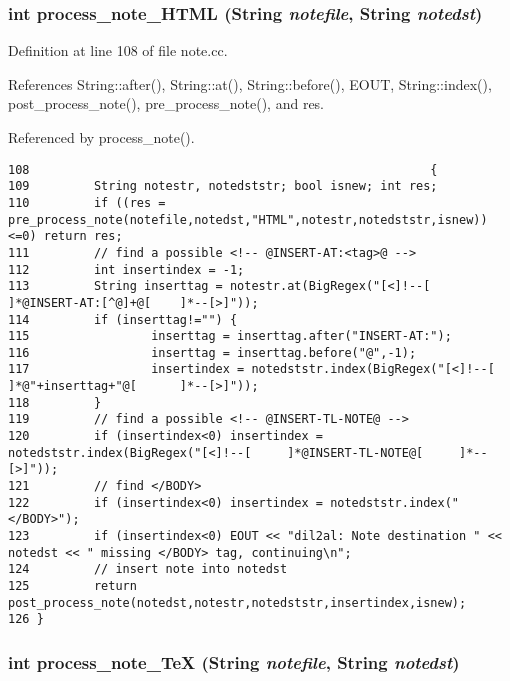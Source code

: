 \subsubsection{\setlength{\rightskip}{0pt plus 5cm}int process\_\-note\_\-HTML ({\bf String} {\em notefile}, {\bf String} {\em notedst})}\label{note_8cc_a4}




Definition at line 108 of file note.cc.

References String::after(), String::at(), String::before(), EOUT, String::index(), post\_\-process\_\-note(), pre\_\-process\_\-note(), and res.

Referenced by process\_\-note().



\footnotesize\begin{verbatim}108                                                        {
109         String notestr, notedststr; bool isnew; int res;
110         if ((res = pre_process_note(notefile,notedst,"HTML",notestr,notedststr,isnew))<=0) return res;
111         // find a possible <!-- @INSERT-AT:<tag>@ -->
112         int insertindex = -1;
113         String inserttag = notestr.at(BigRegex("[<]!--[         ]*@INSERT-AT:[^@]+@[    ]*--[>]"));
114         if (inserttag!="") {
115                 inserttag = inserttag.after("INSERT-AT:");
116                 inserttag = inserttag.before("@",-1);
117                 insertindex = notedststr.index(BigRegex("[<]!--[        ]*@"+inserttag+"@[      ]*--[>]"));
118         }
119         // find a possible <!-- @INSERT-TL-NOTE@ -->
120         if (insertindex<0) insertindex = notedststr.index(BigRegex("[<]!--[     ]*@INSERT-TL-NOTE@[     ]*--[>]"));
121         // find </BODY>
122         if (insertindex<0) insertindex = notedststr.index("</BODY>");
123         if (insertindex<0) EOUT << "dil2al: Note destination " << notedst << " missing </BODY> tag, continuing\n";
124         // insert note into notedst
125         return post_process_note(notedst,notestr,notedststr,insertindex,isnew);
126 }
\end{verbatim}\normalsize 
{}
\subsubsection{\setlength{\rightskip}{0pt plus 5cm}int process\_\-note\_\-Te\-X ({\bf String} {\em notefile}, {\bf String} {\em notedst})}\label{note_8cc_a5}




